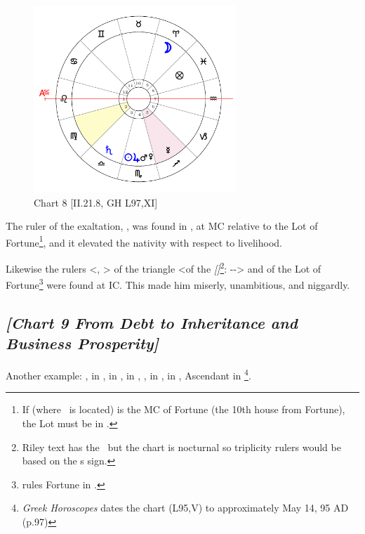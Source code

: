 \clearpage
\begin{figure}
\centering
\vspace{-20pt}
\includegraphics[width=0.68\textwidth]{charts/2_21_8}
\caption{Chart 8 [II.21.8, GH L97,XI]}
\label{fig:chart08}
\end{figure}

The ruler of the exaltation, \Mercury, was found in \Sagittarius, at MC relative to the Lot of Fortune\footnote{If \Sagittarius\xspace (where \Mercury\, is located) is the MC of Fortune (the 10th house from Fortune), the Lot must be in \Pisces.}, and it elevated the nativity with respect to livelihood. 

Likewise the rulers <\Sun, \Jupiter> of the triangle <of the \textsl{[\Moon]}\footnote{Riley text has the \Sun\, but the chart is nocturnal so triplicity rulers would be based on the \Moon
s sign.}: \Aries-\Leo-\Sagittarius> and of the Lot of Fortune\footnote{\Jupiter\xspace rules Fortune in \Pisces.} were found at IC. This made him miserly, unambitious, and niggardly.

\newpage
\subsection*{\textit{[Chart 9 From Debt to Inheritance and Business Prosperity]}}
\addcontentsline{toc}{subsection}{\textit{[Chart 9 [GH L95] From Debt to Inheritance and Business Prosperity}}

Another example: \Sun, \Mercury\xspace in \Taurus, \Moon\xspace in \Aquarius, \Saturn\xspace in \Leo, \Mars, \Venus\xspace in \Cancer, \Jupiter\xspace in \Virgo, Ascendant in \Sagittarius
\footnote{\textit{Greek Horoscopes} dates the chart (L95,V) to approximately May 14, 95 AD (p.97)}.

